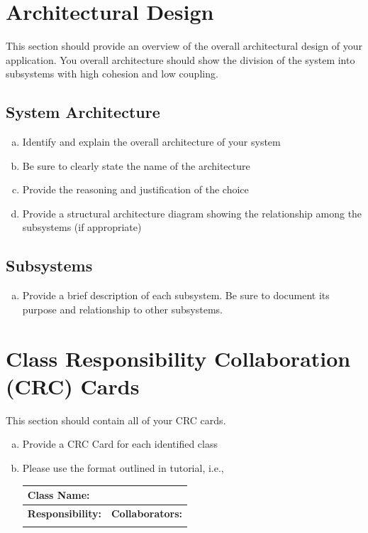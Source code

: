 \documentclass[]{article}
\begin{document}
\section{Architectural Design}
\label{sec:architectural_design}
This section should provide an overview of the overall architectural design of your application. You overall architecture should show the division of the system into subsystems with high cohesion and low coupling.

\subsection{System Architecture}
\label{sub:system_architecture}
\begin{enumerate}[a)]
	\item Identify and explain the overall architecture of your system
	\item Be sure to clearly state the name of the architecture
	\item Provide the reasoning and justification of the choice
	\item Provide a structural architecture diagram showing the relationship among the subsystems (if appropriate)
\end{enumerate}

\subsection{Subsystems}
\label{sub:subsystems}
\begin{enumerate}[a)]
	\item Provide a brief description of each subsystem. Be sure to document its purpose and relationship to other subsystems.
\end{enumerate}

	
\section{Class Responsibility Collaboration (CRC) Cards}
\label{sec:class_responsibility_collaboration_crc_cards}
This section should contain all of your CRC cards.

\begin{enumerate}[a)]
	\item Provide a CRC Card for each identified class
	\item Please use the format outlined in tutorial, i.e., 
	\begin{table}[ht]
		\centering
		\begin{tabular}{|p{5cm}|p{5cm}|}
		\hline 
		 \multicolumn{2}{|l|}{\textbf{Class Name:}} \\
		\hline
		\textbf{Responsibility:} & \textbf{Collaborators:} \\
		\hline
		\vspace{1in} & \\
		\hline
		\end{tabular}
	\end{table}
	
\end{enumerate}
\end{document}
